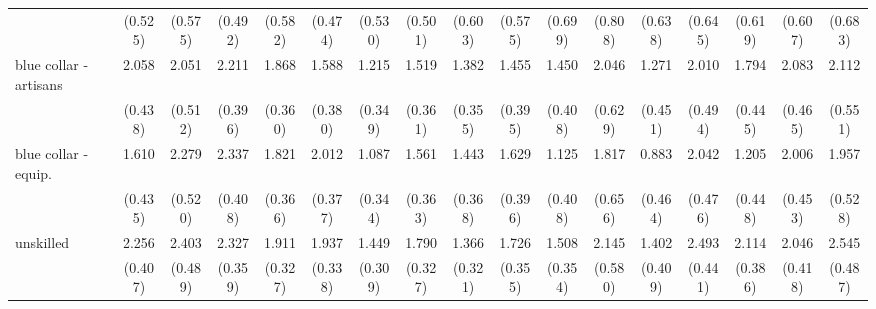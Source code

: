 {\begin{tabular}{l*{16}{c}}
                    &     (0.525)         &     (0.575)         &     (0.492)         &     (0.582)         &     (0.474)         &     (0.530)         &     (0.501)         &     (0.603)         &     (0.575)         &     (0.699)         &     (0.808)         &     (0.638)         &     (0.645)         &     (0.619)         &     (0.607)         &     (0.683)         \\
[1em]
blue collar - artisans&       2.058\sym{***}&       2.051\sym{***}&       2.211\sym{***}&       1.868\sym{***}&       1.588\sym{***}&       1.215\sym{***}&       1.519\sym{***}&       1.382\sym{***}&       1.455\sym{***}&       1.450\sym{***}&       2.046\sym{**} &       1.271\sym{**} &       2.010\sym{***}&       1.794\sym{***}&       2.083\sym{***}&       2.112\sym{***}\\
                    &     (0.438)         &     (0.512)         &     (0.396)         &     (0.360)         &     (0.380)         &     (0.349)         &     (0.361)         &     (0.355)         &     (0.395)         &     (0.408)         &     (0.629)         &     (0.451)         &     (0.494)         &     (0.445)         &     (0.465)         &     (0.551)         \\
[1em]
blue collar - equip.&       1.610\sym{***}&       2.279\sym{***}&       2.337\sym{***}&       1.821\sym{***}&       2.012\sym{***}&       1.087\sym{**} &       1.561\sym{***}&       1.443\sym{***}&       1.629\sym{***}&       1.125\sym{**} &       1.817\sym{**} &       0.883         &       2.042\sym{***}&       1.205\sym{**} &       2.006\sym{***}&       1.957\sym{***}\\
                    &     (0.435)         &     (0.520)         &     (0.408)         &     (0.366)         &     (0.377)         &     (0.344)         &     (0.363)         &     (0.368)         &     (0.396)         &     (0.408)         &     (0.656)         &     (0.464)         &     (0.476)         &     (0.448)         &     (0.453)         &     (0.528)         \\
[1em]
unskilled           &       2.256\sym{***}&       2.403\sym{***}&       2.327\sym{***}&       1.911\sym{***}&       1.937\sym{***}&       1.449\sym{***}&       1.790\sym{***}&       1.366\sym{***}&       1.726\sym{***}&       1.508\sym{***}&       2.145\sym{***}&       1.402\sym{***}&       2.493\sym{***}&       2.114\sym{***}&       2.046\sym{***}&       2.545\sym{***}\\
                    &     (0.407)         &     (0.489)         &     (0.359)         &     (0.327)         &     (0.338)         &     (0.309)         &     (0.327)         &     (0.321)         &     (0.355)         &     (0.354)         &     (0.580)         &     (0.409)         &     (0.441)         &     (0.386)         &     (0.418)         &     (0.487)         \\

\end{tabular}}
